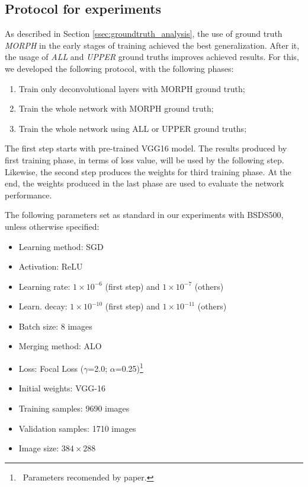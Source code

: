 \subsection{Protocol for experiments}
\label{ssec:framework_experiments}

As described in Section \ref{ssec:groundtruth_analysis}, the use of ground truth \textit{MORPH} in the early stages of training achieved the best generalization.
After it, the usage of \textit{ALL} and \textit{UPPER} ground truths improves achieved results.
For this, we developed the following protocol, with the following phases:

\begin{enumerate}
    \item Train only deconvolutional layers with MORPH ground truth;
    \item Train the whole network with MORPH ground truth;
    \item Train the whole network using ALL or UPPER ground truths;
\end{enumerate}

The first step starts with pre-trained VGG16 model.
The results produced by first training phase, in terms of loss value, will be used by the following step.
Likewise, the second step produces the weights for third training phase.
At the end, the weights produced in the last phase are used to evaluate the network performance.

The following parameters set as standard in our experiments with BSDS500, unless otherwise specified:
\begin{itemize}
    \item Learning method: SGD
    \item Activation: ReLU
    \item Learning rate: $1 \times 10^{-6}$ (first step) and $1 \times 10^{-7}$ (others)
    \item Learn. decay: $1 \times 10^{-10}$ (first step) and $1 \times 10^{-11}$ (others)
    \item Batch size: 8 images
    \item Merging method: ALO
    \item Loss: Focal Loss ($\gamma$=2.0; $\alpha$=0.25)\footnote{~Parameters recomended by  paper.}
    \item Initial weights: VGG-16
    \item Training samples: 9690 images 
    \item Validation samples: 1710 images
    \item Image size: $384 \times 288$
\end{itemize}

